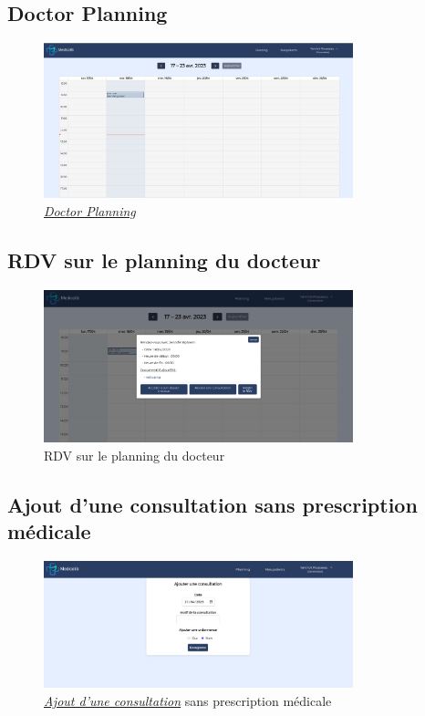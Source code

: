 \documentclass[a4paper]{report}
\begin{document}
\subsection{Doctor Planning}
\begin{figure}[H]
    \vspace{-10pt}
    \centering
    \includegraphics[width=0.8\textwidth]{captures/doctor-planning.png}
    \caption{\textit{\hyperref[planning]{Doctor Planning}}}
    \label{fig:DCU24}
\end{figure}

\subsection{RDV sur le planning du docteur}
\begin{figure}[H]
    \vspace{-10pt}
    \centering
    \includegraphics[width=0.8\textwidth]{captures/doctor-click-rdv.png}
    \caption{RDV sur le planning du docteur}
    \label{fig:DCU25}
\end{figure}

\subsection{Ajout d'une consultation sans prescription médicale}
\begin{figure}[H]
    \vspace{-10pt}
    \centering
    \includegraphics[width=0.8\textwidth]{captures/consultation-no-prescription.png}
    \caption{\textit{\hyperref[consultation]{Ajout d'une consultation}} sans prescription médicale}
    \label{fig:DCU26}
\end{figure}
\end{document}
